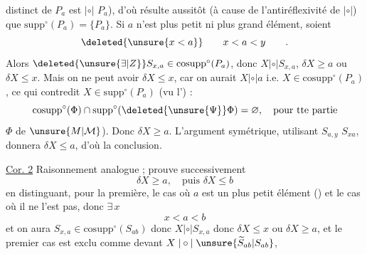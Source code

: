 distinct de $P_a$ est $\mathrel{|\circ|}$  $P_a$), d'où résulte aussitôt (à cause de l'antiréflexivité de $\mathrel{|\circ|}$) que $\mathrm{supp}^{\circ}(P_a)=\{P_a\}$. Si $a$ n'est  plus petit ni plus grand élément, soient
\[
 \deleted{\unsure{x<a}}\qquad x<a<y\qquad .
\]
Alors $\deleted{\unsure{\exists|Z}}S_{x,a}\in\mathrm{cosupp}^{\circ}(P_a)$, donc $X\mathrel{|\circ|}S_{x,a}$,  $\delta X\geq a$ ou $\delta X\leq x$. Mais on ne peut avoir $\delta X\leq x$, car on aurait $X\mathrel{|\circ|}a$ i.e. $X\in\mathrm{cosupp}^{\circ}(P_a)$, ce qui contredit $X\in\mathrm{supp}^{\circ}(P_a)$ (vu l') :
\[
 \mathrm{cosupp}^{\circ}(\Phi)\cap\mathrm{supp}^{\circ}(\deleted{\unsure{\Psi}}\Phi)=\varnothing,\quad\text{pour tte partie}
\]
$\Phi$ de $\unsure{M|\mathcal M}$). Donc $\delta X\geq a$. L'argument symétrique, utilisant $S_{a,y}$  $S_{xa}$, donnera $\delta X\leq a$, d'où la conclusion.

\uline{Cor. 2} Raisonnement analogue ;    prouve successivement
\[
 \delta X\geq a,\quad\text{puis }\delta X\leq b
\]
en distinguant, pour la première, le cas où $a$ est un plus petit élément () et le cas où il ne l'est pas, donc $\exists\,x$
\[
 x<a<b
\]
et on aura $S_{x,a}\in\mathrm{cosupp}^{\circ}(S_{ab})$ donc $X\mathrel{|\circ|}S_{x,a}$ donc $\delta X\leq x$ ou $\delta X\geq a$, et le premier cas est exclu comme devant  $X\mathrel{|\circ|}\unsure{\widetilde S_{ab}|S_{ab}}$, 
